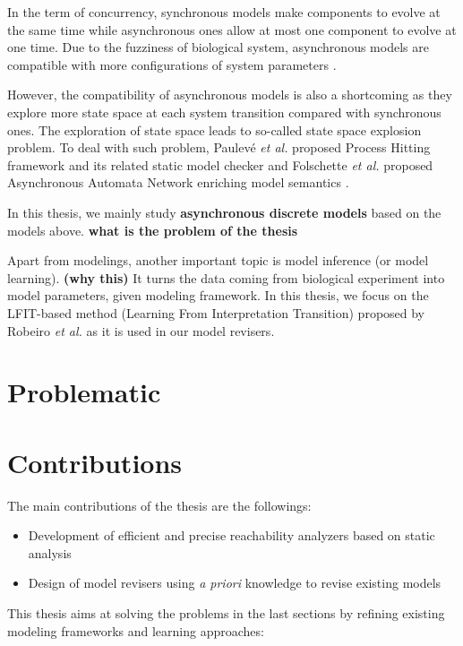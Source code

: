 In the term of concurrency, synchronous models make components to evolve at the same time while asynchronous ones allow at most one component to evolve at one time.
Due to the fuzziness of biological system, asynchronous models are compatible with more configurations of system parameters \cite{bernot2009}.

However, the compatibility of asynchronous models is also a shortcoming as they explore more state space at each system transition compared with synchronous ones.
The exploration of state space leads to so-called state space explosion problem.
To deal with such problem, Paulev\'e \textit{et al.} proposed Process Hitting framework and its related static model checker \cite{pauleve2012} and Folschette \textit{et al.} proposed Asynchronous Automata Network enriching model semantics \cite{folschette2015}.

In this thesis, we mainly study \textbf{asynchronous discrete models} based on the models above. \textbf{what is the problem of the thesis}

Apart from modelings, another important topic is model inference (or model learning). \textbf{(why this)}
It turns the data coming from biological experiment into model parameters, given modeling framework.
In this thesis, we focus on the LFIT-based method (Learning From Interpretation Transition) proposed by Robeiro \textit{et al.} \cite{ribeiro2015learning,ribeiro2018learning,ribeiro2017inductive} as it is used in our model revisers.

\section{Problematic}


\section{Contributions}\label{sec:contribution}
The main contributions of the thesis are the followings:
\begin{itemize}
    \item Development of efficient and precise reachability analyzers based on static analysis
    \item Design of model revisers using \textit{a priori} knowledge to revise existing models
\end{itemize}

This thesis aims at solving the problems in the last sections by refining existing modeling frameworks and learning approaches:

